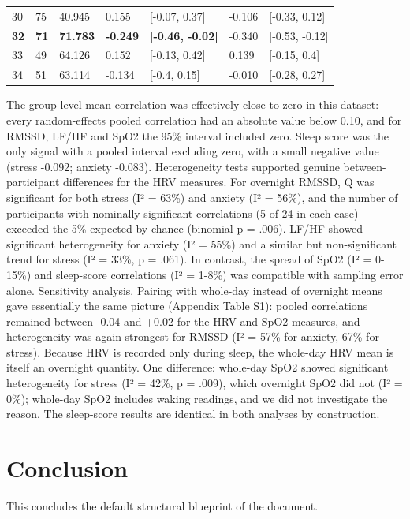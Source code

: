 \documentclass[11pt, a4paper, oneside]{article}
\begin{document}
\begin{table}[H]
\begin{tabularx}{\textwidth}{XXXXXXX}
        30  & 75   & 40.945  & 0.155 & [-0.07, 0.37] & -0.106 & [-0.33, 0.12]\\
        \textbf{32}  & \textbf{71}   & \textbf{71.783}  &\textbf{-0.249}& \textbf{[-0.46, -0.02]} & -0.340 &[-0.53, -0.12]\\
        33  & 49   & 64.126    & 0.152 & [-0.13, 0.42] & 0.139 & [-0.15, 0.4]\\
        34  & 51   & 63.114  & -0.134& [-0.4, 0.15] & -0.010 & [-0.28, 0.27]\\
        \bottomrule
    \end{tabularx}
    \label{tab:Table_3}
\end{table}

The group-level mean correlation was effectively close to zero in this dataset: every random-effects pooled correlation had an absolute value below 0.10, and for RMSSD, LF/HF and SpO2 the 95\% interval included zero. Sleep score was the only signal with a pooled interval excluding zero, with a small negative value (stress -0.092; anxiety -0.083).
Heterogeneity tests supported genuine between-participant differences for the HRV measures. For overnight RMSSD, Q was significant for both stress (I² = 63\%) and anxiety (I² = 56\%), and the number of participants with nominally significant correlations (5 of 24 in each case) exceeded the 5\% expected by chance (binomial p = .006). LF/HF showed significant heterogeneity for anxiety (I² = 55\%) and a similar but non-significant trend for stress (I² = 33\%, p = .061). In contrast, the spread of SpO2 (I² = 0-15\%) and sleep-score correlations (I² = 1-8\%) was compatible with sampling error alone.
Sensitivity analysis. Pairing with whole-day instead of overnight means gave essentially the same picture (Appendix Table S1): pooled correlations remained between -0.04 and +0.02 for the HRV and SpO2 measures, and heterogeneity was again strongest for RMSSD (I² = 57\% for anxiety, 67\% for stress). Because HRV is recorded only during sleep, the whole-day HRV mean is itself an overnight quantity. One difference: whole-day SpO2 showed significant heterogeneity for stress (I² = 42\%, p = .009), which overnight SpO2 did not (I² = 0\%); whole-day SpO2 includes waking readings, and we did not investigate the reason. The sleep-score results are identical in both analyses by construction.


\section{Conclusion}
This concludes the default structural blueprint of the document.
\end{document}
